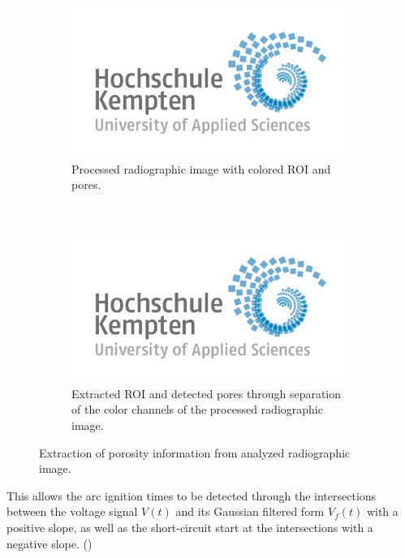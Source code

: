     
    
        
        
    
        

    
\begin{figure}[!h]
    \begin{subfigure}[b]{\textwidth}
        \includegraphics[width=\textwidth]{Figures/logo-thk.jpg}
        \caption{Processed radiographic image with colored ROI and pores.}
    \end{subfigure}\\
    \begin{subfigure}[b]{\textwidth}
        \includegraphics[width=\textwidth]{Figures/logo-thk.jpg}
        \caption{Extracted ROI and detected pores through separation of the color channels of the processed radiographic image.}
    \end{subfigure}
    \caption{Extraction of porosity information from analyzed radiographic image.}
    \label{fig:pore_extraction}
\end{figure}



    This allows the arc ignition times to be detected through the intersections between the voltage signal \(V(t)\) and its Gaussian filtered form \(V_f(t)\) with a positive slope, as well as the short-circuit start at the intersections with a negative slope. ()%

